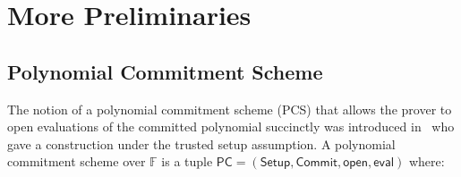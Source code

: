 \documentclass[sigconf]{acmart}
\newcommand{\F}{\mathbb{F}}
\newcommand{\pc}{\mathsf{PC}}
\newcommand{\pcsetup}{\mathsf{Setup}}
\newcommand{\pccommit}{\mathsf{Commit}}
\newcommand{\pcopen}{\mathsf{open}}
\newcommand{\pceval}{\mathsf{eval}}
\providecommand{\DIFaddbegin}{} %
\providecommand{\DIFaddend}{} %
\newcommand{\DIFaddincludegraphics}[2][]{{\color{blue}\fbox{\DIFOincludegraphics[#1]{#2}}}} %
\DeclareRobustCommand{\DIFaddbegin}{\DIFOaddbegin \let\includegraphics\DIFaddincludegraphics} %
\DeclareRobustCommand{\DIFaddend}{\DIFOaddend \let\includegraphics\DIFOincludegraphics} %
\begin{document}
		
		
		
		
		
		
		
		
		\DIFaddend 
		
%		
		\appendix
		
		
		
		
		
		\DIFaddbegin 
		
		
		
		
		\DIFaddend \section{More Preliminaries}
		
		\subsection{Polynomial Commitment Scheme}
		\label{sec:pcs_def}
		The notion of a polynomial commitment scheme (PCS) that allows the prover to open evaluations of the committed polynomial succinctly was introduced in~\cite{AC:KatZavGol10} who gave a construction under the trusted setup assumption.
		A polynomial commitment scheme over $\F$ is a tuple $\pc = 
		(\pcsetup,\pccommit,\pcopen,\pceval)$ where:
		
\end{document}
